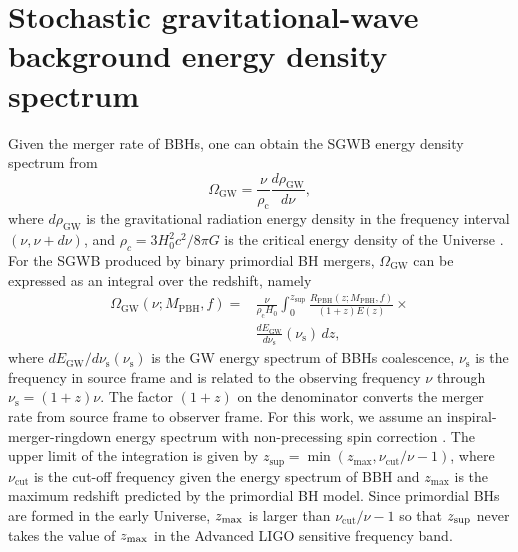 \section{Stochastic gravitational-wave background energy density spectrum} 
\noindent Given the merger rate of \acp{BBH}, one can obtain the \ac{SGWB} energy density spectrum from
\begin{equation}
\Omega_{\textrm{GW}}=\frac{\nu}{\rho_\textrm{c}}\frac{d\rho_{\textrm{GW}}}{d\nu},
\end{equation}
where $d\rho_{\textrm{GW}}$ is the gravitational radiation energy density in the frequency interval $(\nu,\nu+d\nu)$, and $\rho_c = 3H_0^2 c^2/8\pi G$ is the critical energy density of the Universe \cite{Allen:1997ad}.
For the \ac{SGWB} produced by binary primordial \ac{BH} mergers, $\Omega_{\textrm{GW}}$ can be expressed as an integral over the redshift, namely
\begin{align}
\Omega_{\textrm{GW}}(\nu;M_\textrm{PBH},f) = &\frac{\nu}{\rho_\textrm{c}H_0} \int_{0}^{z_{\textrm{sup}}} \frac{R_\textrm{PBH}(z;M_\textrm{PBH},f)}{(1+z)E(z)} \times  \\ \nonumber
& \frac{dE_\textrm{GW}}{d\nu_\textrm{s}}(\nu_\textrm{s}) \, dz,
\label{GW spectrum}
\end{align}
where ${dE_\textrm{GW}}/{d\nu_\textrm{s}}(\nu_\textrm{s})$ is the \ac{GW} energy spectrum of \acp{BBH} coalescence, $\nu_\textrm{s}$ is the frequency in source frame and is related to the observing frequency $\nu$ through $\nu_\textrm{s}=(1+z)\nu$. The factor $(1+z)$ on the denominator converts the merger rate from source frame to observer frame.
For this work, we assume an inspiral-merger-ringdown energy spectrum with non-precessing spin correction \cite{IMRPhenomA,IMRPhenomB}.
The upper limit of the integration is given by $z_{\textrm{sup}}=\min(z_{\textrm{max}},\nu_{\textrm{cut}}/\nu-1)$, where $\nu_\textrm{cut}$ is the cut-off frequency given the energy spectrum of \ac{BBH} and $z_{\textrm{max}}$ is the maximum redshift predicted by the primordial \ac{BH} model.
Since primordial \acp{BH} are formed in the early Universe, $z_{\rm max}$ is larger than $\nu_{\textrm{cut}}/\nu-1$ so that $z_{\rm sup}$ never takes the value of $z_{\rm max}$ in the Advanced LIGO sensitive frequency band.

